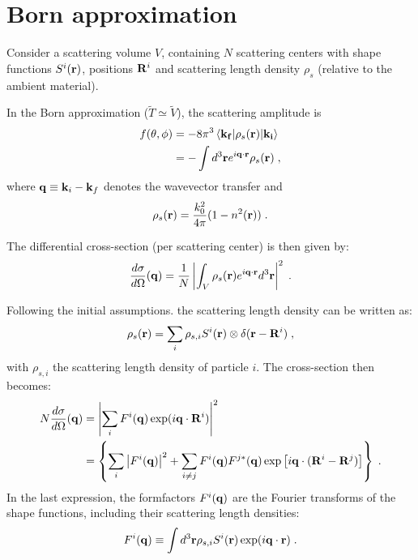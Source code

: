 \section{Born approximation} \label{sec:ba}

Consider a scattering volume $V$, containing $N$ scattering centers with shape functions $S^i(\mathbf{r})$, positions $\mathbf{R}^i$ and scattering length density $\rho_s$ (relative to the ambient material).

In the Born approximation ($\widetilde{T}\simeq\widetilde{V}$), the scattering amplitude is
\begin{align*}
  f(\theta, \phi) & = -8\pi^3 \left\langle \mathbf{k_f} \vert \rho_s(\mathbf{r}) \vert \mathbf{k_i} \right\rangle \nonumber \\
  & = -\int d^3\mathbf{r} e^{i\mathbf{q}\cdot\mathbf{r}} \rho_s(\mathbf{r}) \; ,
\end{align*}
where $\mathbf{q}\equiv \mathbf{k}_i - \mathbf{k}_f$ denotes the wavevector transfer and
\begin{equation*}
  \rho_s(\mathbf{r}) = \frac{k_0^2}{4\pi}(1-n^2(\mathbf{r})) \; .
\end{equation*}

The differential cross-section (per scattering center) is then given by:
\begin{equation*}
  \frac{d\sigma}{d\Omega}(\mathbf{q}) = \frac{1}{N}\left\lvert \int_V \rho_s(\mathbf{r}) e^{i\mathbf{q}\cdot\mathbf{r}} d^3\mathbf{r} \right\rvert ^2 \; .
\end{equation*}

Following the initial assumptions. the scattering length density can be written as:
\begin{equation*}
\rho_s(\mathbf{r}) = \sum_i \rho_{s,i} S^i(\mathbf{r}) \otimes \delta (\mathbf{r}-\mathbf{R}^i) \; ,
\end{equation*}
with $\rho_{s,i}$ the scattering length density of particle $i$. The cross-section then becomes:
\begin{align*}
  N\frac{d\sigma}{d\Omega}(\mathbf{q}) & = \left\lvert \sum_i F^i(\mathbf{q}) \exp (i\mathbf{q}\cdot\mathbf{R}^i) \right\rvert ^2  \\
  & = \left\lbrace \sum_i \left\lvert F^i(\mathbf{q}) \right\rvert ^2 + \sum_{i\neq j} F^i(\mathbf{q}) F^{j*}(\mathbf{q}) \exp \left[i\mathbf{q}\cdot (\mathbf{R}^i-\mathbf{R}^j)\right] \right\rbrace \; .
\end{align*}
In the last expression, the formfactors $F^i(\mathbf{q})$ are the Fourier transforms of the shape functions, including their scattering length densities:
\begin{equation*}
  F^i(\mathbf{q}) \equiv \int d^3\mathbf{r} \rho_{s,i} S^i(\mathbf{r}) \exp (i\mathbf{q}\cdot\mathbf{r} ) \; .
\end{equation*}

